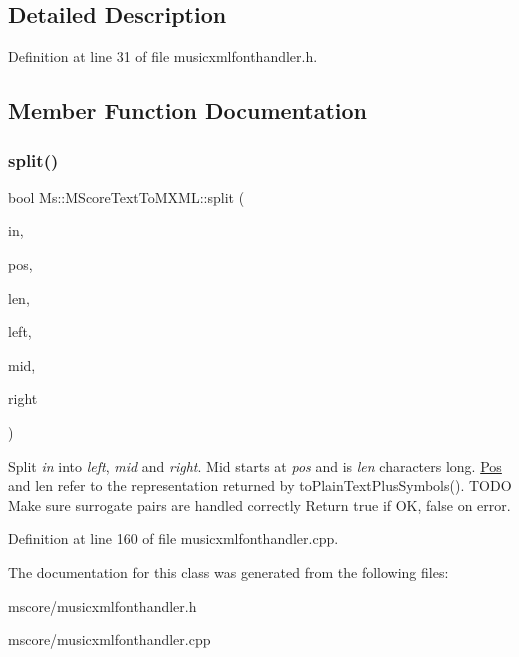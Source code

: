 \subsection{Detailed Description}


Definition at line 31 of file musicxmlfonthandler.\+h.



\subsection{Member Function Documentation}
\mbox{\label{class_ms_1_1_m_score_text_to_m_x_m_l_aff039b5b1f23a9875231705efb2a69de}} 
\subsubsection{\texorpdfstring{split()}{split()}}
{\footnotesize\ttfamily bool Ms\+::\+M\+Score\+Text\+To\+M\+X\+M\+L\+::split (\begin{DoxyParamCaption}\item[{const Q\+List$<$ \hyperlink{class_ms_1_1_text_fragment}{Text\+Fragment} $>$ \&}]{in,  }\item[{const int}]{pos,  }\item[{const int}]{len,  }\item[{Q\+List$<$ \hyperlink{class_ms_1_1_text_fragment}{Text\+Fragment} $>$ \&}]{left,  }\item[{Q\+List$<$ \hyperlink{class_ms_1_1_text_fragment}{Text\+Fragment} $>$ \&}]{mid,  }\item[{Q\+List$<$ \hyperlink{class_ms_1_1_text_fragment}{Text\+Fragment} $>$ \&}]{right }\end{DoxyParamCaption})\hspace{0.3cm}{\ttfamily [static]}}

Split {\itshape in} into {\itshape left}, {\itshape mid} and {\itshape right}. Mid starts at {\itshape pos} and is {\itshape len} characters long. \hyperlink{class_ms_1_1_pos}{Pos} and len refer to the representation returned by to\+Plain\+Text\+Plus\+Symbols(). T\+O\+DO Make sure surrogate pairs are handled correctly Return true if OK, false on error. 

Definition at line 160 of file musicxmlfonthandler.\+cpp.



The documentation for this class was generated from the following files\+:\begin{DoxyCompactItemize}
\item 
mscore/musicxmlfonthandler.\+h\item 
mscore/musicxmlfonthandler.\+cpp\end{DoxyCompactItemize}
